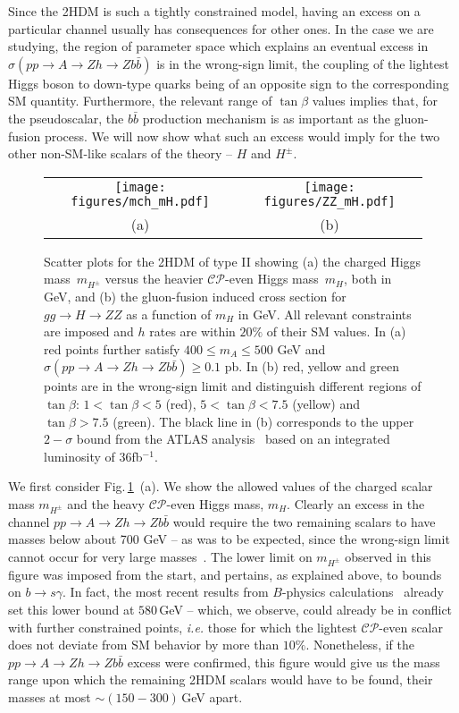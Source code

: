 \documentclass[12pt]{article}
\newcommand{\abbrev}{\scalefont{.9}}
\newcommand{\fig}[1]{Fig.\,\ref{#1}}
\newcommand{\sm}{{\abbrev SM}}
\newcommand{\thdm}{{\abbrev 2HDM}}
\newcommand{\atlas}{{\abbrev ATLAS}}
\newcommand{\cp}{{\abbrev $\mathcal{CP}$}}
\begin{document}
Since the \thdm{} is such a tightly constrained model, having an excess on a particular
channel usually has consequences for other ones. In the case we are studying, the region
of parameter space which explains an eventual excess in $\sigma(pp\to A \to Zh
\to Zb\bar{b})$ is in the wrong-sign limit, the coupling of the lightest Higgs boson
to down-type quarks being of an opposite sign to the corresponding \sm{} quantity. Furthermore, the
relevant range of $\tan\beta$ values implies that, for the pseudoscalar,
the $b\bar{b}$ production mechanism is as important as the gluon-fusion
process. We will now show what such an excess would imply for the two other non-\sm{}-like
scalars of the theory -- $H$ and $H^\pm$.
%
\begin{figure}[t]
\begin{tabular}{cc}
\texttt{[image: figures/mch\_mH.pdf]}&
\texttt{[image: figures/ZZ\_mH.pdf]}\\
 (a) & (b)
\end{tabular}
\caption{Scatter plots for the \thdm{} of type II showing
(a) the charged Higgs mass~$m_{H^\pm}$ versus the heavier \cp{}-even Higgs mass~$m_H$, both in GeV, and
(b) the gluon-fusion induced cross section for $gg\to H \to ZZ$ as a function of $m_H$ in GeV.
All relevant constraints are imposed and $h$ rates are within $20\%$ of their \sm{} values.
In (a) red points further satisfy $400\leq m_A\leq 500$ GeV and $\sigma(pp\to A \to Zh\to Zb\bar{b}) \geq 0.1$ pb.
In (b) red, yellow and green points are in the wrong-sign limit
and distinguish different regions of $\tan\beta$: $1<\tan\beta<5$ (red), $5<\tan\beta<7.5$ (yellow) and $\tan\beta>7.5$ (green).
The black line in (b) corresponds to the upper
$2-\sigma$ bound from the \atlas{} analysis~\cite{ATLAS-CONF-2017-058} based on an integrated
luminosity of $36$fb$^{-1}$.}
\label{fig:HpmHZZ}
\end{figure}

We first consider \fig{fig:HpmHZZ}~(a). We show the allowed values of
the charged scalar mass $m_{H^\pm}$ and the heavy \cp{}-even Higgs mass, $m_H$.
Clearly an excess in the channel $pp\to A \to Zh
\to Zb\bar{b}$ would require the two remaining scalars to have masses below about 700 GeV --
as was to be expected, since the wrong-sign limit cannot occur for very large
masses~\cite{Ferreira:2014naa}. The lower limit on $m_{H^\pm}$ observed in this figure
was imposed from the start, and pertains, as explained above, to bounds on $b\to s\gamma$.
In fact, the most recent results from $B$-physics calculations~\cite{Misiak:2017bgg}
already set this lower bound at $580$\,GeV -- which, we observe, could already be in
conflict with further constrained points, {\em i.e.} those for which the lightest
\cp{}-even scalar does not deviate from \sm{} behavior by more than $10\%$. Nonetheless,
if the $pp\to A \to Zh \to Zb\bar{b}$ excess were confirmed, this figure would give us the mass
range upon which the remaining \thdm{} scalars would have to be found, their masses at most
$\sim (150-300)$\,GeV apart.
\end{document}

